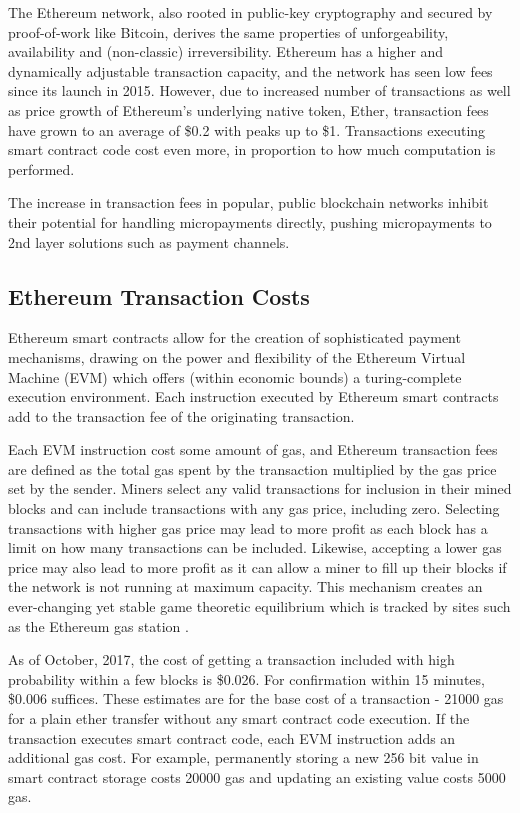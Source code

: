 The Ethereum network, also rooted in public-key cryptography and secured by proof-of-work like Bitcoin, derives the same properties of unforgeability, availability and (non-classic) irreversibility. Ethereum has a higher and dynamically adjustable transaction capacity, and the network has seen low fees since its launch in 2015. However, due to increased number of transactions as well as price growth of Ethereum's underlying native token, Ether, transaction fees have grown\cite{BitInfoChartsETH} to an average of \$0.2 with peaks up to \$1. Transactions executing smart contract code cost even more, in proportion to how much computation is performed.

The increase in transaction fees in popular, public blockchain networks inhibit their potential for handling micropayments directly, pushing micropayments to 2nd layer solutions such as payment channels.

\subsection{Ethereum Transaction Costs}

Ethereum smart contracts allow for the creation of sophisticated payment mechanisms, drawing on the power and flexibility of the Ethereum Virtual Machine\cite{ETHSpec} (EVM) which offers (within economic bounds) a turing-complete execution environment. Each instruction executed by Ethereum smart contracts add to the transaction fee of the originating transaction.

Each EVM instruction cost some amount of gas, and Ethereum transaction fees are defined as the total gas spent by the transaction multiplied by the gas price set by the sender. Miners select any valid transactions for inclusion in their mined blocks and can include transactions with any gas price, including zero. Selecting transactions with higher gas price may lead to more profit as each block has a limit on how many transactions can be included. Likewise, accepting a lower gas price may also lead to more profit as it can allow a miner to fill up their blocks if the network is not running at maximum capacity. This mechanism creates an ever-changing yet stable game theoretic equilibrium which is tracked by sites such as the Ethereum gas station \cite{ETHGas}.

As of October, 2017, the cost of getting a transaction included with high probability within a few blocks is \$0.026. For confirmation within 15 minutes, \$0.006 suffices. These estimates are for the base cost of a transaction - 21000 gas for a plain ether transfer without any smart contract code execution. If the transaction executes smart contract code, each EVM instruction adds an additional gas cost. For example, permanently storing a new 256 bit value in smart contract storage costs 20000 gas and updating an existing value costs 5000 gas.

